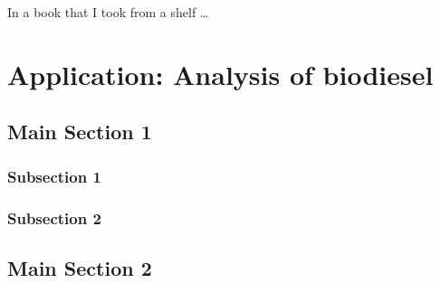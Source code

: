 
\begin{savequote}[45mm]
In a book that I took from a shelf \ldots
{}
\end{savequote}

\chapter{Application: Analysis of biodiesel} %

\label{Chapter7} %


\section{Main Section 1}

\subsection{Subsection 1}



\subsection{Subsection 2}


\section{Main Section 2}
